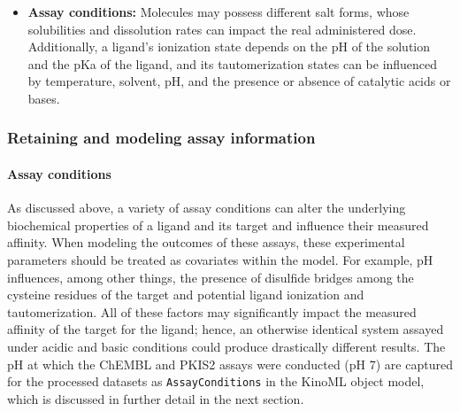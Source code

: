 \documentclass[9pt,lessons]{livecoms}
\begin{document}
\begin{itemize}
\item {\bf Assay conditions:} Molecules may possess different salt forms, whose solubilities and dissolution rates can impact the real administered dose. Additionally, a ligand's ionization state depends on the pH of the solution and the pKa of the ligand, and its tautomerization states can be influenced by temperature, solvent, pH, and the presence or absence of catalytic acids or bases.~\cite{lu2021ionization}
\end{itemize}

\subsubsection{Retaining and modeling assay information}

\paragraph{Assay conditions}

As discussed above, a variety of assay conditions can alter the underlying biochemical properties of a ligand and its target and influence their measured affinity. When modeling the outcomes of these assays, these experimental parameters should be treated as covariates within the model. For example, pH influences, among other things, the presence of disulfide bridges among the cysteine residues of the target and potential ligand ionization and tautomerization. All of these factors may significantly impact the measured affinity of the target for the ligand; hence, an otherwise identical system assayed under acidic and basic conditions could produce drastically different results. The pH at which the ChEMBL and PKIS2 assays were conducted (pH 7) are captured for the processed datasets as \texttt{AssayConditions} in the KinoML object model, which is discussed in further detail in the next section.
\end{document}
